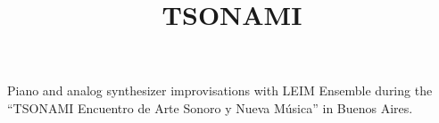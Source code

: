  
 \title{ TSONAMI }
 \begin{position}
{ Piano and analog synthesizer improvisations with LEIM Ensemble during the ``TSONAMI Encuentro de Arte Sonoro y Nueva Música'' in Buenos Aires. }
\end{position}
 


